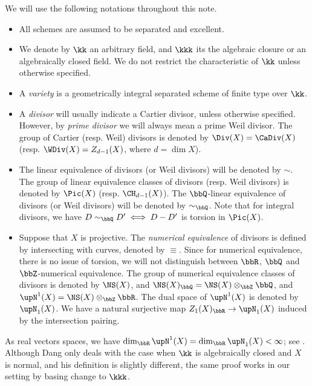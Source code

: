   \begin{notation}
    We will use the following notations throughout this note.
    \begin{itemize}
      \item All schemes are assumed to be separated and excellent.
      \item We denote by $\kk$ an arbitrary field, and $\kkk$ its the algebraic closure or an algebraically closed field.
        We do not restrict the characteristic of $\kk$ unless otherwise specified.
      \item A \emph{variety} is a geometrically integral separated scheme of finite type over $\kk$.
      \item A \emph{divisor} will usually indicate a Cartier divisor, unless otherwise specified.
        However, by \emph{prime divisor} we will always mean a prime Weil divisor.
        The group of Cartier (resp. Weil) divisors is denoted by $\Div(X) = \CaDiv(X)$ (resp. $\WDiv(X) = Z_{d-1}(X)$, where $d = \dim X$).
      \item The linear equivalence of divisors (or Weil divisors) will be denoted by $\sim$.
        The group of linear equivalence classes of divisors (resp. Weil divisors) is denoted by $\Pic(X)$ (resp. $\CH_{d-1}(X)$).
        The $\bbQ$-linear equivalence of divisors (or Weil divisors) will be denoted by $\sim_\bbQ$.
        Note that for integral divisors, we have $D \sim_\bbQ D' \iff D - D'$ is torsion in $\Pic(X)$.
       
      \item Suppose that $X$ is projective.
        The \emph{numerical equivalence} of divisors is defined by intersecting with curves, denoted by $\equiv$.
        Since for numerical equivalence, there is no issue of torsion, we will not distinguish between $\bbR$, $\bbQ$ and $\bbZ$-numerical equivalence.
        The group of numerical equivalence classes of divisors is denoted by $\NS(X)$, and $\NS(X)_\bbQ = \NS(X) \otimes_\bbZ \bbQ$, and $\upN^1(X) = \NS(X) \otimes_\bbZ \bbR$.
        The dual space of $\upN^1(X)$ is denoted by $\upN_1(X)$.
        We have a natural surjective map $Z_1(X)_\bbR \to \upN_1(X)$ induced by the intersection pairing.

    \end{itemize}
    
    \Yang{}
  \end{notation}
  
  As real vectors spaces, we have $\dim_\bbR \upN^1(X) = \dim_\bbR \upN_1(X) < \infty$; see \cite[Theorem 2.5.1]{Dang20degrees}.
    Although Dang only deals with the case when $\kk$ is algebraically closed and $X$ is normal, and his definition is slightly different, the same proof works in our setting by basing change to $\kkk$.\Yang{}

